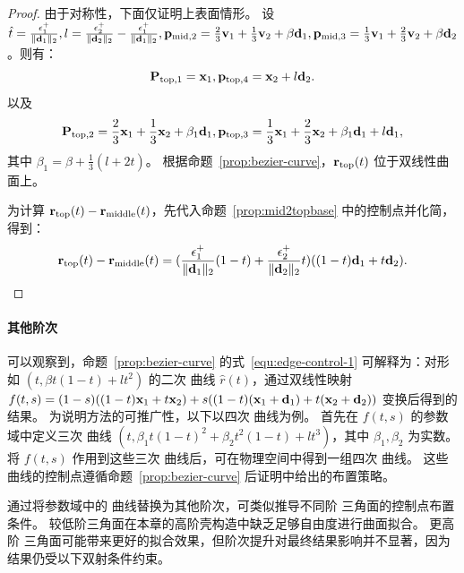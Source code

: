 \begin{proof}
由于对称性，下面仅证明上表面情形。
%
设
$\hat{t}=\frac{\epsilon_1^{+}}{\|\mathbf{d}_1\|_2},l=\frac{\epsilon_2^{+}}{\|\mathbf{d}_2\|_2}-\frac{\epsilon_1^{+}}{\|\mathbf{d}_1\|_2}, \mathbf{p}_{\text{mid},2}=\frac{2}{3}\mathbf{v}_1+\frac{1}{3}\mathbf{v}_2+\beta \mathbf{d}_1,\mathbf{p}_{\text{mid},3}=\frac{1}{3}\mathbf{v}_1+\frac{2}{3}\mathbf{v}_2+\beta \mathbf{d}_2$。则有：
\begin{equation*}
\mathbf{P}_{\text{top},1}=\mathbf{x}_1,\mathbf{p}_{\text{top},4}=\mathbf{x}_2+l \mathbf{d}_2.
\end{equation*}
以及
\begin{equation*}
\mathbf{P}_{\text{top},2}=\frac{2}{3}\mathbf{x}_1+\frac{1}{3}\mathbf{x}_2+\beta_1 \mathbf{d}_1,\mathbf{p}_{\text{top},3}=\frac{1}{3}\mathbf{x}_1+\frac{2}{3}\mathbf{x}_2+\beta_1 \mathbf{d}_1+l \mathbf{d}_1,
\end{equation*}
其中 $\beta_1=\beta+\frac{1}{3}(l+2 \hat{t})$。
根据命题~\ref{prop:bezier-curve}，$\mathbf{r}_{\text{top}}(t)$ 位于双线性曲面上。

为计算 $\mathbf{r}_{\text{top}}(t)-\mathbf{r}_{\text{middle}}(t)$，先代入命题~\ref{prop:mid2topbase} 中的控制点并化简，得到：
$$\mathbf{r}_\text{top}(t) - \mathbf{r}_\text{middle}(t) = (\frac{\epsilon_1^{+}}{\|\mathbf{d}_1\|_2}(1-t)+\frac{\epsilon_2^{+}}{\|\mathbf{d}_2\|_2}t)((1-t)\mathbf{d}_1 + t\mathbf{d}_2).$$
\end{proof}

\paragraph{其他阶次}
可以观察到，命题~\ref{prop:bezier-curve} 的式~\eqref{equ:edge-control-1} 可解释为：对形如 $(t,\beta t(1-t)+l t^2)$ 的二次 \Bezier 曲线 $\hat{r}(t)$，通过双线性映射
$f(t,s)=(1-s)((1-t)\mathbf{x}_1+t\mathbf{x}_2)+s((1-t)(\mathbf{x}_1+\mathbf{d}_1)+t(\mathbf{x}_2+\mathbf{d}_2))$
变换后得到的结果。
为说明方法的可推广性，以下以四次 \Bezier 曲线为例。
首先在 $f(t,s)$ 的参数域中定义三次 \Bezier 曲线
$(t,\beta_1 t(1-t)^2+\beta_2 t^2(1-t)+l t^3)$，其中 $\beta_1,\beta_2$ 为实数。
将 $f(t,s)$ 作用到这些三次 \Bezier 曲线后，可在物理空间中得到一组四次 \Bezier 曲线。
这些 \Bezier 曲线的控制点遵循命题~\ref{prop:bezier-curve} 后证明中给出的布置策略。

通过将参数域中的 \Bezier 曲线替换为其他阶次，可类似推导不同阶 \Bezier 三角面的控制点布置条件。
较低阶三角面在本章的高阶壳构造中缺乏足够自由度进行曲面拟合。
更高阶 \Bezier 三角面可能带来更好的拟合效果，但阶次提升对最终结果影响并不显著，因为结果仍受以下双射条件约束。

